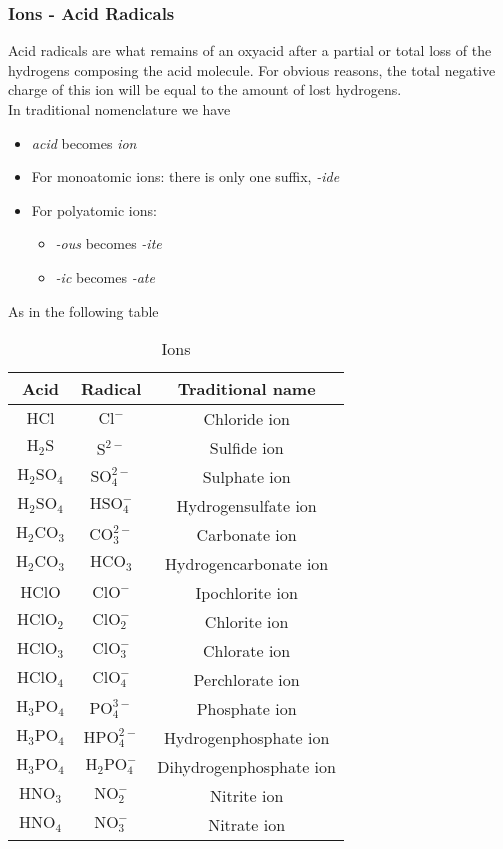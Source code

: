 \documentclass[../qm.tex]{subfiles}
\begin{document}
\subsubsection{Ions - Acid Radicals}
Acid radicals are what remains of an oxyacid after a partial or total loss of the hydrogens composing the acid molecule. For obvious reasons, the total negative charge of this ion will be equal to the amount of lost hydrogens.\\
In traditional nomenclature we have
\begin{itemize}
\item \textit{acid} becomes \textit{ion}
\item For monoatomic ions: there is only one suffix, \textit{-ide}
\item For polyatomic ions:
	\begin{itemize}
	\item \textit{-ous} becomes \textit{-ite}
	\item \textit{-ic} becomes \textit{-ate}
	\end{itemize}
\end{itemize}
As in the following table
\begin{table}[H]
	\centering
	\begin{tabular}{c|c|c}
		Acid&Radical&Traditional name\\\hline
		$\mathrm{HCl}$&$\mathrm{Cl^-}$&Chloride ion\\\hline
		$\mathrm{H_2S}$&$\mathrm{S^{2-}}$&Sulfide ion\\\hline
		$\mathrm{H_2SO_4}$&$\mathrm{SO_4^{2-}}$&Sulphate ion\\\hline
		$\mathrm{H_2SO_4}$&$\mathrm{HSO_4^-}$&Hydrogensulfate ion\\\hline
		$\mathrm{H_2CO_3}$&$\mathrm{CO_3^{2-}}$&Carbonate ion\\\hline
		$\mathrm{H_{2}CO_3}$&$\mathrm{HCO_3}$&Hydrogencarbonate ion\\\hline
		$\mathrm{HClO}$&$\mathrm{ClO^-}$&Ipochlorite ion\\\hline
		$\mathrm{HClO_2}$&$\mathrm{ClO_2^-}$&Chlorite ion\\\hline
		$\mathrm{HClO_3}$&$\mathrm{ClO_3^{-}}$&Chlorate ion\\\hline
		$\mathrm{HClO_4}$&$\mathrm{ClO_4^-}$&Perchlorate ion\\\hline
		$\mathrm{H_3PO_4}$&$\mathrm{PO_4^{3-}}$&Phosphate ion\\\hline
		$\mathrm{H_3PO_4}$&$\mathrm{HPO_4^{2-}}$&Hydrogenphosphate ion\\\hline
		$\mathrm{H_3PO_4}$&$\mathrm{H_2PO_{4}^-}$&Dihydrogenphosphate ion\\\hline
		$\mathrm{HNO_3}$&$\mathrm{NO_2^-}$&Nitrite ion\\\hline
		$\mathrm{HNO_4}$&$\mathrm{NO_3^-}$&Nitrate ion\\\hline
	\end{tabular}
	\caption{Ions}
	\label{tab:ions.chem}
\end{table}
\end{document}
